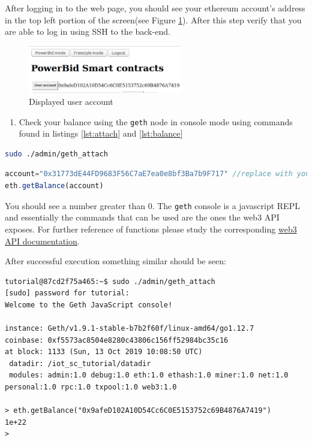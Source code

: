 \documentclass[a4paper]{article}
\begin{document}
After logging in to the web page, you should see your ethereum account's address in the top left portion of the screen(see Figure \ref{fig:login-user-acc}). After this step verify that you are able to log in using SSH to the back-end.

\begin{figure}[H]
    \centering
    \includegraphics[width=0.6\textwidth]{figures/login-useracc.png}
    \caption{Displayed user account}
    \label{fig:login-user-acc}
\end{figure}

\begin{enumerate}[label=\textbf{Task \arabic*}:,l_tasks]
\item Check your balance using the \texttt{geth} node in console mode using commands found in listings \ref{lst:attach} and \ref{lst:balance}
\end{enumerate}

\begin{lstlisting}[language=bash,caption={attach to geth node},label={lst:attach}]
sudo ./admin/geth_attach 
\end{lstlisting}

\begin{lstlisting}[language=javascript,caption={Function for checking balance},label={lst:balance}]
account="0x31773dE44FD9683F56C7aE7ea0e8bf3Ba7b9F717" //replace with your account
eth.getBalance(account)
\end{lstlisting}

You should see a number greater than 0. The \verb!geth! console is a javascript REPL and essentially the commands that can be used are the ones the web3 API exposes. For further reference of functions please study the corresponding \href{https://web3js.readthedocs.io/en/v1.2.1/web3.html}{web3 API documentation}.


After successful execution something similar should be seen:
\begin{verbatim}
tutorial@87cd2f75a465:~$ sudo ./admin/geth_attach 
[sudo] password for tutorial: 
Welcome to the Geth JavaScript console!

instance: Geth/v1.9.1-stable-b7b2f60f/linux-amd64/go1.12.7
coinbase: 0xf5573ac8504e8280c43806c156ff52984bc35c16
at block: 1133 (Sun, 13 Oct 2019 10:08:50 UTC)
 datadir: /iot_sc_tutorial/datadir
 modules: admin:1.0 debug:1.0 eth:1.0 ethash:1.0 miner:1.0 net:1.0 personal:1.0 rpc:1.0 txpool:1.0 web3:1.0

> eth.getBalance("0x9afeD102A10D54Cc6C0E5153752c69B4876A7419")
1e+22
> 
\end{verbatim}
\end{document}

